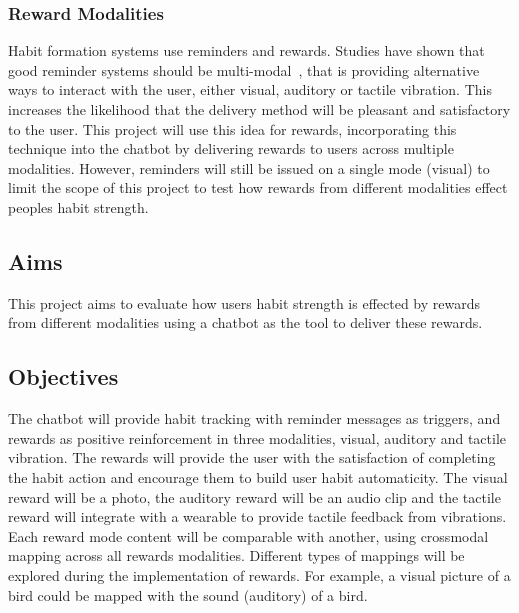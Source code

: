 \subsubsection*{Reward Modalities}
Habit formation systems use reminders and rewards. Studies have shown that good reminder systems should be multi-modal~\cite{article_designing_multimodal_reminders_for_home}, that is providing alternative ways to interact with the user, either visual, auditory or tactile vibration. This increases the likelihood that the delivery method will be pleasant and satisfactory to the user. This project will use this idea for rewards, incorporating this technique into the chatbot by delivering rewards to users across multiple modalities. However, reminders will still be issued on a single mode (visual) to limit the scope of this project to test how rewards from different modalities effect peoples habit strength.

\subsection*{Aims}
This project aims to evaluate how users habit strength is effected by rewards from different modalities using a chatbot as the tool to deliver these rewards.

\subsection*{Objectives}
The chatbot will provide habit tracking with reminder messages as triggers, and rewards as positive reinforcement in three modalities, visual, auditory and tactile vibration.\newline
\newline
The rewards will provide the user with the satisfaction of completing the habit action and encourage them to build user habit automaticity. The visual reward will be a photo, the auditory reward will be an audio clip and the tactile reward will integrate with a wearable to provide tactile feedback from vibrations. Each reward mode content will be comparable with another, using crossmodal mapping across all rewards modalities. Different types of mappings will be explored during the implementation of rewards. For example, a visual picture of a bird could be mapped with the sound (auditory) of a bird.

